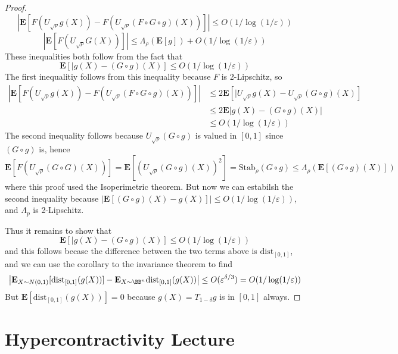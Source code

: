 \begin{proof}
    \[ \left| \mathbf{E}[F(U_{\sqrt{\rho}} g(X)) - F(U_{\sqrt{\rho}} (F \circ G \circ g) (X))] \right| \leq O(1/\log(1/\varepsilon)) \]
    \[ |\mathbf{E}[F(U_{\sqrt{\rho}} G(X))]| \leq \Lambda_\rho(\mathbf{E}[g]) + O(1/\log(1/\varepsilon)) \]
    These inequalities both follow from the fact that
    \[ \mathbf{E}[|g(X) - (G \circ g)(X)] \leq O(1/\log(1/\varepsilon)) \]
    The first inequalitiy follows from this inequality because $F$ is 2-Lipschitz, so
    \begin{align*}
        \left| \mathbf{E}[F(U_{\sqrt{\rho}} g(X)) - F(U_{\sqrt{\rho}} (F \circ G \circ g) (X))] \right| &\leq 2 \mathbf{E}[|U_{\sqrt{\rho}} g(X) - U_{\sqrt{\rho}} (G \circ g)(X)]\\
        &\leq 2 \mathbf{E} |g(X) - (G \circ g)(X)|\\
        &\leq O(1/\log(1/\varepsilon))
    \end{align*}
    The second inequality follows because $U_{\sqrt{\rho}} (G \circ g)$ is valued in $[0,1]$ since $(G \circ g)$ is, hence
    \[ \mathbf{E}[F(U_{\sqrt{\rho}} (G \circ G)(X))] = \mathbf{E}[(U_{\sqrt{\rho}} (G \circ g)(X))^2] = \text{Stab}_\rho(G \circ g) \leq \Lambda_\rho(\mathbf{E}[(G \circ g)(X)]) \]
    where this proof used the Isoperimetric theorem. But now we can estabilsh the second inequality because $|\mathbf{E}[(G \circ g)(X) - g(X)]| \leq O(1/\log(1/\varepsilon))$, and $\Lambda_p$ is 2-Lipschitz.

    Thus it remains to show that
    \[ \mathbf{E}[|g(X) - (G \circ g)(X)] \leq O(1/\log(1/\varepsilon)) \]
    and this follows becase the difference between the two terms above is $\text{dist}_{[0,1]}$, and we can use the corollary to the invariance theorem to find
    \[ \left| \mathbf{E}_{X \sim N(0,1)}[\text{dist}_{[0,1]}(g(X))] - \mathbf{E}_{X \sim \BB^n} \text{dist}_{[0,1]}(g(X)) \right| \leq O(\varepsilon^{\delta/3}) = O(1/\log(1/\varepsilon)) \]
    But $\mathbf{E}[\text{dist}_{[0,1]}(g(X))] = 0$ because $g(X) = T_{1-\delta}g$ is in $[0,1]$ always.
\end{proof}

\chapter{Hypercontractivity Lecture}

